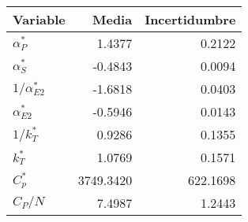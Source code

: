 \begin{tabular}{lrr}
\toprule
Variable & Media & Incertidumbre \\
\midrule
$\alpha_P^*$ & 1.4377 & 0.2122 \\
$\alpha_S^*$ & -0.4843 & 0.0094 \\
$1/\alpha_{E2}^*$ & -1.6818 & 0.0403 \\
$\alpha_{E2}^*$ & -0.5946 & 0.0143 \\
$1/k_T^*$ & 0.9286 & 0.1355 \\
$k_T^*$ & 1.0769 & 0.1571 \\
$C_p^*$ & 3749.3420 & 622.1698 \\
$C_P/N$ & 7.4987 & 1.2443 \\
\bottomrule
\end{tabular}
